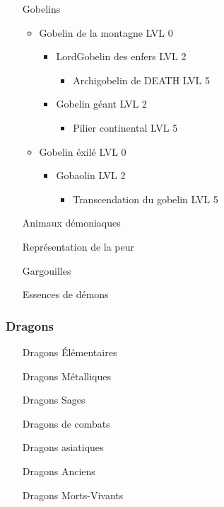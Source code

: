 \begin{itemize}
\begin{itemize}
\begin{itemize}
\begin{itemize}
						\end{itemize}
				\end{itemize}
		\end{itemize}~\\
	\item[Gobelins] ~\\
		\begin{itemize}
			\item Gobelin de la montagne LVL 0
				\begin{itemize}
					\item LordGobelin des enfers LVL 2
						\begin{itemize}
							\item Archigobelin de DEATH  LVL 5
						\end{itemize}
					\item Gobelin géant LVL 2
						\begin{itemize}
							\item Pilier continental LVL 5
						\end{itemize}
				\end{itemize}
			\item Gobelin éxilé LVL 0
				\begin{itemize}
					\item  Gobaolin LVL 2
						\begin{itemize}
							\item Transcendation du gobelin LVL 5
						\end{itemize}
				\end{itemize}
		\end{itemize}
	\item[Animaux démoniaques]
	\item[Représentation de la peur]
	\item[Gargouilles]
	\item[Essences de démons]
\end{itemize}

\subsubsection{Dragons}

\begin{itemize}
	\item[Dragons Élémentaires]
	\item[Dragons Métalliques]
	\item[Dragons Sages]
	\item[Dragons de combats]
	\item[Dragons asiatiques]
	\item[Dragons Anciens]
	\item[Dragons Morts-Vivants]
\end{itemize}

